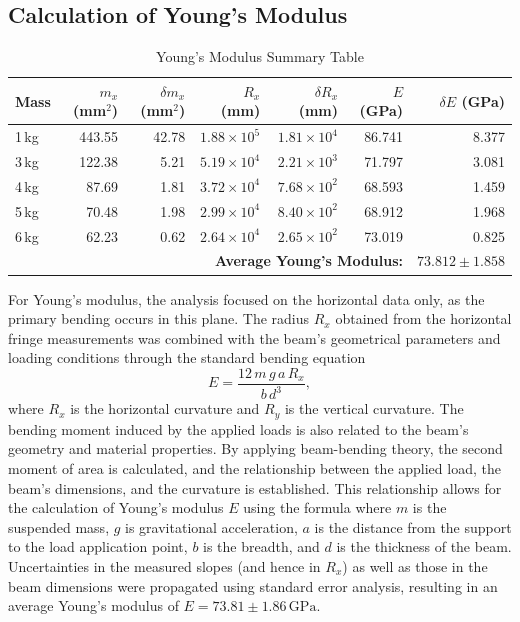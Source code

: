 \documentclass[a4paper,11pt]{article}
\begin{document}
\subsection{Calculation of Young's Modulus}

\begin{table}[H]
  \centering
  \caption{Young's Modulus Summary Table}
  \label{tab:youngs-modulus-summary}
  \begin{tabular}{l r r r r r r}
    \toprule
    Mass & \(m_x\) (mm\(^2\)) & \(\delta m_x\) (mm\(^2\)) & \(R_x\) (mm) & \(\delta R_x\) (mm) & \(E\) (GPa) & \(\delta E\) (GPa) \\
    \midrule
    1\,kg & 443.55 & 42.78 & \(1.88\times10^{5}\) & \(1.81\times10^{4}\) & 86.741 & 8.377 \\
    3\,kg & 122.38 &  5.21 & \(5.19\times10^{4}\) & \(2.21\times10^{3}\) & 71.797 & 3.081 \\
    4\,kg &  87.69 &  1.81 & \(3.72\times10^{4}\) & \(7.68\times10^{2}\) & 68.593 & 1.459 \\
    5\,kg &  70.48 &  1.98 & \(2.99\times10^{4}\) & \(8.40\times10^{2}\) & 68.912 & 1.968 \\
    6\,kg &  62.23 &  0.62 & \(2.64\times10^{4}\) & \(2.65\times10^{2}\) & 73.019 & 0.825 \\
    \midrule
    \multicolumn{6}{r}{\textbf{Average Young's Modulus:}} & \(73.812 \pm 1.858\) \\
    \bottomrule
  \end{tabular}
\end{table}
\noindent

For Young's modulus, the analysis focused on the horizontal data only, as the primary bending occurs in this plane. The radius \(R_x\) obtained from the horizontal fringe measurements was combined with the beam's geometrical parameters and loading conditions through the standard bending equation
\begin{equation}
E = \frac{12\,m\,g\,a\,R_x}{b\,d^3},
\end{equation}
where \(R_x\) is the horizontal curvature and \(R_y\) is the vertical curvature. The bending moment induced by the applied loads is also related to the beam's geometry and material properties. By applying beam-bending theory, the second moment of area is calculated, and the relationship between the applied load, the beam's dimensions, and the curvature is established. This relationship allows for the calculation of Young's modulus \(E\) using the formula
where \(m\) is the suspended mass, \(g\) is gravitational acceleration, \(a\) is the distance from the support to the load application point, \(b\) is the breadth, and \(d\) is the thickness of the beam. Uncertainties in the measured slopes (and hence in \(R_x\)) as well as those in the beam dimensions were propagated using standard error analysis, resulting in an average Young's modulus of \(E = 73.81 \pm 1.86\,\mathrm{GPa}\).\\
\end{document}

